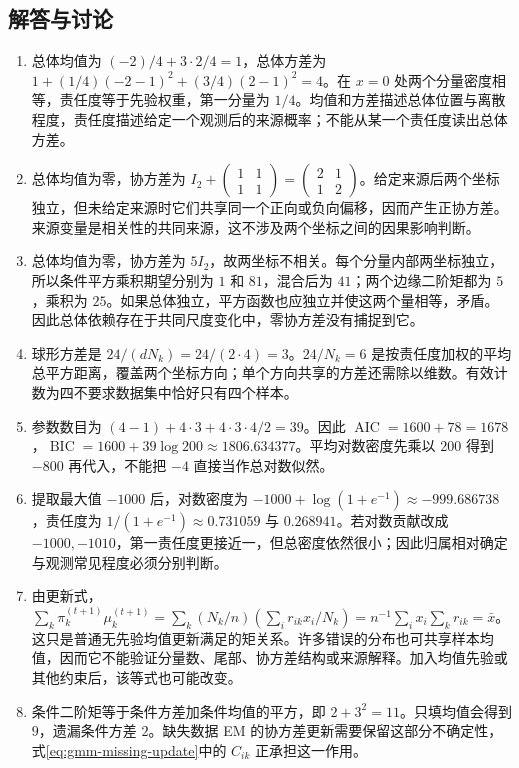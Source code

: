 \documentclass[UTF8,12pt,a4paper,fontset=fandol]{ctexart}
\begin{document}
\subsection{解答与讨论}
\begin{enumerate}
\item 总体均值为 $(-2)/4+3\cdot2/4=1$，总体方差为 $1+(1/4)(-2-1)^2+(3/4)(2-1)^2=4$。在 $x=0$ 处两个分量密度相等，责任度等于先验权重，第一分量为 $1/4$。均值和方差描述总体位置与离散程度，责任度描述给定一个观测后的来源概率；不能从某一个责任度读出总体方差。
\item 总体均值为零，协方差为 $I_2+\begin{pmatrix}1&1\\1&1\end{pmatrix}=\begin{pmatrix}2&1\\1&2\end{pmatrix}$。给定来源后两个坐标独立，但未给定来源时它们共享同一个正向或负向偏移，因而产生正协方差。来源变量是相关性的共同来源，这不涉及两个坐标之间的因果影响判断。
\item 总体均值为零，协方差为 $5I_2$，故两坐标不相关。每个分量内部两坐标独立，所以条件平方乘积期望分别为 $1$ 和 $81$，混合后为 $41$；两个边缘二阶矩都为 $5$，乘积为 $25$。如果总体独立，平方函数也应独立并使这两个量相等，矛盾。因此总体依赖存在于共同尺度变化中，零协方差没有捕捉到它。
\item 球形方差是 $24/(dN_k)=24/(2\cdot4)=3$。$24/N_k=6$ 是按责任度加权的平均总平方距离，覆盖两个坐标方向；单个方向共享的方差还需除以维数。有效计数为四不要求数据集中恰好只有四个样本。
\item 参数数目为 $(4-1)+4\cdot3+4\cdot3\cdot4/2=39$。因此 $\operatorname{AIC}=1600+78=1678$，$\operatorname{BIC}=1600+39\log200\approx1806.634377$。平均对数密度先乘以 $200$ 得到 $-800$ 再代入，不能把 $-4$ 直接当作总对数似然。
\item 提取最大值 $-1000$ 后，对数密度为 $-1000+\log(1+e^{-1})\approx-999.686738$，责任度为 $1/(1+e^{-1})\approx0.731059$ 与 $0.268941$。若对数贡献改成 $-1000,-1010$，第一责任度更接近一，但总密度依然很小；因此归属相对确定与观测常见程度必须分别判断。
\item 由更新式，$\sum_k\pi_k^{(t+1)}\mu_k^{(t+1)}=\sum_k(N_k/n)(\sum_i r_{ik}x_i/N_k)=n^{-1}\sum_i x_i\sum_kr_{ik}=\bar x$。这只是普通无先验均值更新满足的矩关系。许多错误的分布也可共享样本均值，因而它不能验证分量数、尾部、协方差结构或来源解释。加入均值先验或其他约束后，该等式也可能改变。
\item 条件二阶矩等于条件方差加条件均值的平方，即 $2+3^2=11$。只填均值会得到 $9$，遗漏条件方差 $2$。缺失数据 EM 的协方差更新需要保留这部分不确定性，式\eqref{eq:gmm-missing-update}中的 $C_{ik}$ 正承担这一作用。
\end{enumerate}
\end{document}
